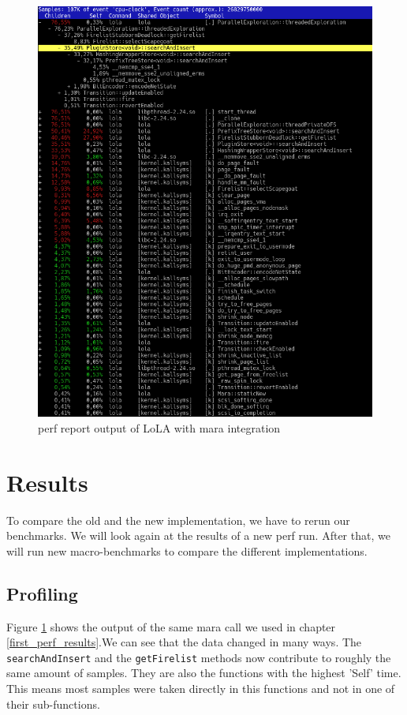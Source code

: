 \begin{figure}
    \centering
    \includegraphics[width=\textwidth]{pictures/perfReportMara.png}
    \caption{perf report output of LoLA with mara integration}
    \label{perf_record_mara}
\end{figure}

\section{Results}
To compare the old and the new implementation, we have to rerun our benchmarks. We will look again at the results of a new perf run. After that, we will run new macro-benchmarks to compare the different implementations.

\subsection{Profiling}
 Figure \ref{perf_record_mara} shows the output of the same mara call we used in chapter \ref{first_perf_results}.We can see that the data changed in many ways. The \texttt{searchAndInsert} and the \texttt{getFirelist} methods now contribute to roughly the same amount of samples. They are also the functions with the highest 'Self' time. This means most samples were taken directly in this functions and not in one of their sub-functions.

